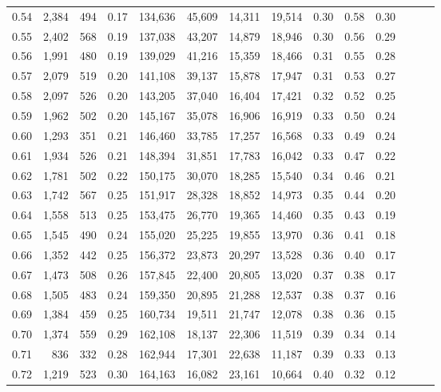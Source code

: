 \begin{tabular}{rrrrrrrrrrrrrr}
0.54 &  2,384 &  494 &  0.17 &  134,636 &   45,609 &  14,311 &  19,514 &  0.30 &  0.58 &      0.30 \\
0.55 &  2,402 &  568 &  0.19 &  137,038 &   43,207 &  14,879 &  18,946 &  0.30 &  0.56 &      0.29 \\
0.56 &  1,991 &  480 &  0.19 &  139,029 &   41,216 &  15,359 &  18,466 &  0.31 &  0.55 &      0.28 \\
0.57 &  2,079 &  519 &  0.20 &  141,108 &   39,137 &  15,878 &  17,947 &  0.31 &  0.53 &      0.27 \\
0.58 &  2,097 &  526 &  0.20 &  143,205 &   37,040 &  16,404 &  17,421 &  0.32 &  0.52 &      0.25 \\
0.59 &  1,962 &  502 &  0.20 &  145,167 &   35,078 &  16,906 &  16,919 &  0.33 &  0.50 &      0.24 \\
0.60 &  1,293 &  351 &  0.21 &  146,460 &   33,785 &  17,257 &  16,568 &  0.33 &  0.49 &      0.24 \\
0.61 &  1,934 &  526 &  0.21 &  148,394 &   31,851 &  17,783 &  16,042 &  0.33 &  0.47 &      0.22 \\
0.62 &  1,781 &  502 &  0.22 &  150,175 &   30,070 &  18,285 &  15,540 &  0.34 &  0.46 &      0.21 \\
0.63 &  1,742 &  567 &  0.25 &  151,917 &   28,328 &  18,852 &  14,973 &  0.35 &  0.44 &      0.20 \\
0.64 &  1,558 &  513 &  0.25 &  153,475 &   26,770 &  19,365 &  14,460 &  0.35 &  0.43 &      0.19 \\
0.65 &  1,545 &  490 &  0.24 &  155,020 &   25,225 &  19,855 &  13,970 &  0.36 &  0.41 &      0.18 \\
0.66 &  1,352 &  442 &  0.25 &  156,372 &   23,873 &  20,297 &  13,528 &  0.36 &  0.40 &      0.17 \\
0.67 &  1,473 &  508 &  0.26 &  157,845 &   22,400 &  20,805 &  13,020 &  0.37 &  0.38 &      0.17 \\
0.68 &  1,505 &  483 &  0.24 &  159,350 &   20,895 &  21,288 &  12,537 &  0.38 &  0.37 &      0.16 \\
0.69 &  1,384 &  459 &  0.25 &  160,734 &   19,511 &  21,747 &  12,078 &  0.38 &  0.36 &      0.15 \\
0.70 &  1,374 &  559 &  0.29 &  162,108 &   18,137 &  22,306 &  11,519 &  0.39 &  0.34 &      0.14 \\
0.71 &    836 &  332 &  0.28 &  162,944 &   17,301 &  22,638 &  11,187 &  0.39 &  0.33 &      0.13 \\
0.72 &  1,219 &  523 &  0.30 &  164,163 &   16,082 &  23,161 &  10,664 &  0.40 &  0.32 &      0.12 \\

\end{tabular}
